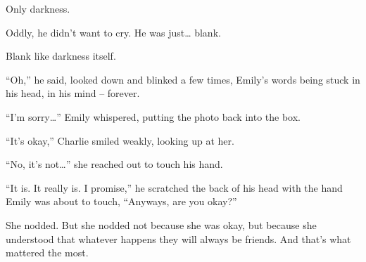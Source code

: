 Only darkness.

Oddly, he didn't want to cry. He was just… blank.

Blank like darkness itself.

“Oh,” he said, looked down and blinked a few times, Emily's words being stuck in his head, in his mind – forever.

“I'm sorry…” Emily whispered, putting the photo back into the box.

“It's okay,” Charlie smiled weakly, looking up at her.

“No, it's not…” she reached out to touch his hand.

“It is. It really is. I promise,” he scratched the back of his head with the hand Emily was about to touch, “Anyways, are you okay?”

She nodded. But she nodded not because she was okay, but because she understood that whatever happens they will always be friends. And that's what mattered the most.